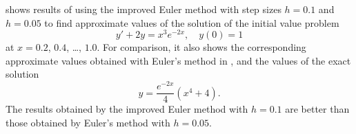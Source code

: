 \begin{example}\label{example:3.2.2}
 shows results of using the improved Euler method
with step sizes $h=0.1$ and $h=0.05$ to find approximate values of the
solution of the initial value problem
\[
y'+2y=x^3e^{-2x},\quad y(0)=1
\]
at $x=0.2$, $0.4$, \dots, $1.0$.
For comparison, it also shows the
corresponding approximate values obtained with Euler's method in
, and the values of the exact solution
\[
y=\frac{e^{-2x}}{4}(x^4+4).
\]
The results
obtained by the improved Euler method with $h=0.1$ are better than
those obtained by Euler's method with $h=0.05$.
\end{example}

\begin{table}
\caption{Numerical solution of $y'+2y=x^3e^{-2x},\ y(0)=1$, by Euler's method and the improved Euler method.}
\label{table:3.2.2}

\end{table}
